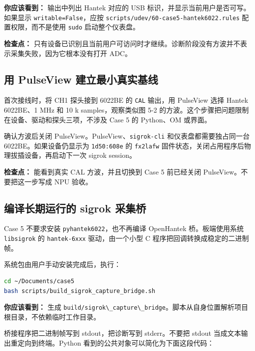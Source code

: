 \textbf{你应该看到：} 输出中列出 Hantek 对应的 USB
标识，并显示当前用户是否可写。如果显示
\passthrough{\lstinline!writable=False!}，应按
\passthrough{\lstinline!scripts/udev/60-case5-hantek6022.rules!}
配置权限，而不是使用 \passthrough{\lstinline!sudo!} 启动整个仪表盘。

\textbf{检查点：}
只有设备已识别且当前用户可访问时才继续。诊断阶段没有方波并不表示采集失败，因为它根本没有打开
ADC。

\subsection{用 PulseView
建立最小真实基线}\label{src-experiment-case5-pulseview-baseline}

首次接线时，将 CH1 探头接到 6022BE 的 \passthrough{\lstinline!CAL!}
输出，用 PulseView 选择 Hantek 6022BE、1 MHz 和 10 k samples，观察类似图
5-2 的方波。这个步骤把问题限制在设备、驱动和探头三项，不涉及 Case 5 的
Python、OM 或界面。

确认方波后关闭
PulseView。PulseView、\passthrough{\lstinline!sigrok-cli!}
和仪表盘都需要独占同一台 6022BE。如果设备仍显示为
\passthrough{\lstinline!1d50:608e!} 的 \passthrough{\lstinline!fx2lafw!}
固件状态，关闭占用程序后物理拔插设备，再启动下一次 sigrok session。

\textbf{检查点：} 能看到真实 CAL 方波，并且切换到 Case 5 前已经关闭
PulseView。不要把这一步写成 NPU 验收。

\subsection{编译长期运行的 sigrok
采集桥}\label{src-experiment-case5-build-bridge}

Case 5 不要求安装 \passthrough{\lstinline!pyhantek6022!}，也不再编译
OpenHantek 桥。板端使用系统 \passthrough{\lstinline!libsigrok!} 的
\passthrough{\lstinline!hantek-6xxx!} 驱动，由一个小型 C
程序把回调转换成稳定的二进制帧。

系统包由用户手动安装完成后，执行：

\begin{lstlisting}[language=bash]
cd ~/Documents/case5
bash scripts/build_sigrok_capture_bridge.sh
\end{lstlisting}

\textbf{你应该看到：} 生成
\passthrough{\lstinline!build/sigrok\_capture\_bridge!}。脚本从自身位置解析项目根目录，不依赖临时工作目录。

桥接程序把二进制帧写到 stdout，把诊断写到 stderr。不要把 stdout
当成文本输出重定向到终端。Python 看到的公共对象可以简化为下面这段代码：

